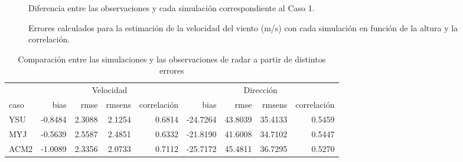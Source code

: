 \documentclass[12pt,spanish,oneside]{book}
\begin{document}
\begin{figure}
\caption{Diferencia entre las observaciones y cada simulación  correspondiente al Caso 1. \label{dif}}\label{fig:diferencia}
\end{figure}

\begin{figure}

{\centering {}\newline{}

}

\caption{Errores calculados para la estimación de la velocidad del viento (m/s) con cada simulación en función de la altura y la correlación. \label{err-spd}}\label{fig:err-spd}
\end{figure}

\begin{table}[!h]

\caption{\label{tab:err-tabla}Comparación entre las simulaciones y las observaciones de radar a partir de distintos errores}
\centering
\begin{tabular}[t]{lrrrrrrrr}
\toprule
\multicolumn{1}{c}{ } & \multicolumn{4}{c}{Velocidad} & \multicolumn{4}{c}{Dirección} \\
\cmidrule(l{2pt}r{2pt}){2-5} \cmidrule(l{2pt}r{2pt}){6-9}
caso & bias & rmse & rmsens & correlación & bias & rmse & rmsens & correlación\\
\midrule
YSU & -0.8484 & 2.3088 & 2.1254 & 0.6814 & -24.7264 & 43.8039 & 35.4133 & 0.5459\\
MYJ & -0.5639 & 2.5587 & 2.4851 & 0.6332 & -21.8190 & 41.6008 & 34.7102 & 0.5447\\
ACM2 & -1.0089 & 2.3356 & 2.0733 & 0.7112 & -25.7172 & 45.4811 & 36.7295 & 0.5270\\
\bottomrule
\end{tabular}
\end{table}
\end{document}
